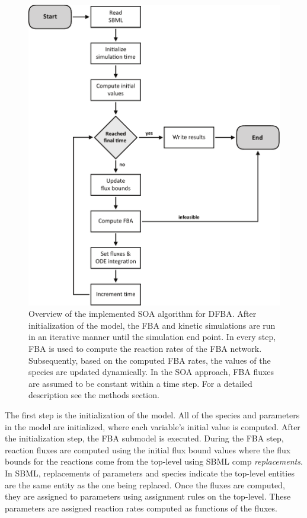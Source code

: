\documentclass{bioinfo}
\begin{document}
\begin{methods}
\begin{figure}[!t]
\centerline{\includegraphics[width=1.0\linewidth]{figures/Fig1_simulation_algorithm.pdf}}
	\caption{Overview of the implemented SOA algorithm for DFBA. After initialization of the model, the FBA and kinetic simulations are run in an iterative manner until the simulation end point. In every step, FBA is used to compute the reaction rates of the FBA network. Subsequently, based on the computed FBA rates, the values of the species are updated dynamically. In the SOA approach, FBA fluxes are assumed to be constant within a time step. For a detailed description see the methods section.}\label{fig:sim}
\end{figure}

The first step is the initialization of the model. All of the species and parameters in the model are initialized, where each variable's initial value is computed. After the initialization step, the FBA submodel is executed. During the FBA step, reaction fluxes are computed using the initial flux bound values where the flux bounds for the reactions come from the top-level using SBML comp \emph{replacements}. In SBML, replacements of parameters and species indicate the top-level entities are the same entity as the one being replaced. Once the fluxes are computed, they are assigned to parameters using assignment rules on the top-level. These parameters are assigned reaction rates computed as functions of the fluxes.


\end{methods}
\end{document}
